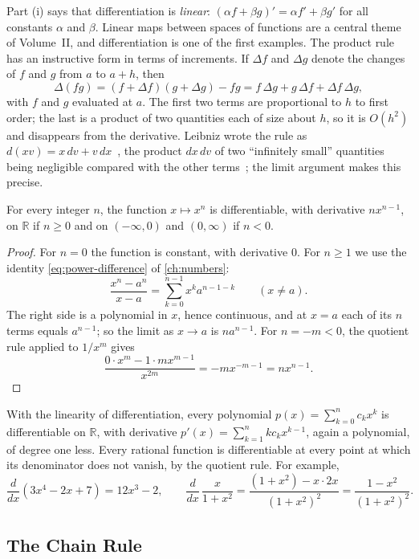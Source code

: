 Part (i) says that differentiation is \emph{linear}: $(\alpha f+\beta g)'=\alpha f'+\beta g'$ for all constants $\alpha$ and $\beta$. Linear maps between spaces of functions are a central theme of Volume~II, and differentiation is one of the first examples. The product rule has an instructive form in terms of increments. If $\Delta f$ and $\Delta g$ denote the changes of $f$ and $g$ from $a$ to $a+h$, then
\[
\Delta(fg)=(f+\Delta f)(g+\Delta g)-fg=f\,\Delta g+g\,\Delta f+\Delta f\,\Delta g ,
\]
with $f$ and $g$ evaluated at $a$. The first two terms are proportional to $h$ to first order; the last is a product of two quantities each of size about $h$, so it is $O(h^2)$ and disappears from the derivative. Leibniz wrote the rule as $d(xv)=x\,dv+v\,dx$~\cite{leibniz1684}, the product $dx\,dv$ of two ``infinitely small'' quantities being negligible compared with the other terms~\cite{edwards1979}; the limit argument makes this precise.

\begin{proposition}[Powers]
\label{prop:power-rule}
For every integer $n$, the function $x\mapsto x^n$ is differentiable, with derivative $nx^{n-1}$, on $\mathbb R$ if $n\ge0$ and on $(-\infty,0)$ and $(0,\infty)$ if $n<0$.
\end{proposition}

\begin{proof}
For $n=0$ the function is constant, with derivative $0$. For $n\ge1$ we use the identity \eqref{eq:power-difference} of \cref{ch:numbers}:
\[
\frac{x^n-a^n}{x-a}=\sum_{k=0}^{n-1}x^ka^{n-1-k}\qquad(x\ne a).
\]
The right side is a polynomial in $x$, hence continuous, and at $x=a$ each of its $n$ terms equals $a^{n-1}$; so the limit as $x\to a$ is $na^{n-1}$. For $n=-m<0$, the quotient rule applied to $1/x^m$ gives
\[
\frac{0\cdot x^m-1\cdot mx^{m-1}}{x^{2m}}=-mx^{-m-1}=nx^{n-1}.
\]
\end{proof}

With the linearity of differentiation, every polynomial $p(x)=\sum_{k=0}^nc_kx^k$ is differentiable on $\mathbb R$, with derivative $p'(x)=\sum_{k=1}^nkc_kx^{k-1}$, again a polynomial, of degree one less. Every rational function is differentiable at every point at which its denominator does not vanish, by the quotient rule. For example,
\[
\frac d{dx}(3x^4-2x+7)=12x^3-2,\qquad\frac d{dx}\,\frac x{1+x^2}=\frac{(1+x^2)-x\cdot2x}{(1+x^2)^2}=\frac{1-x^2}{(1+x^2)^2}.
\]

\subsection{The Chain Rule}


